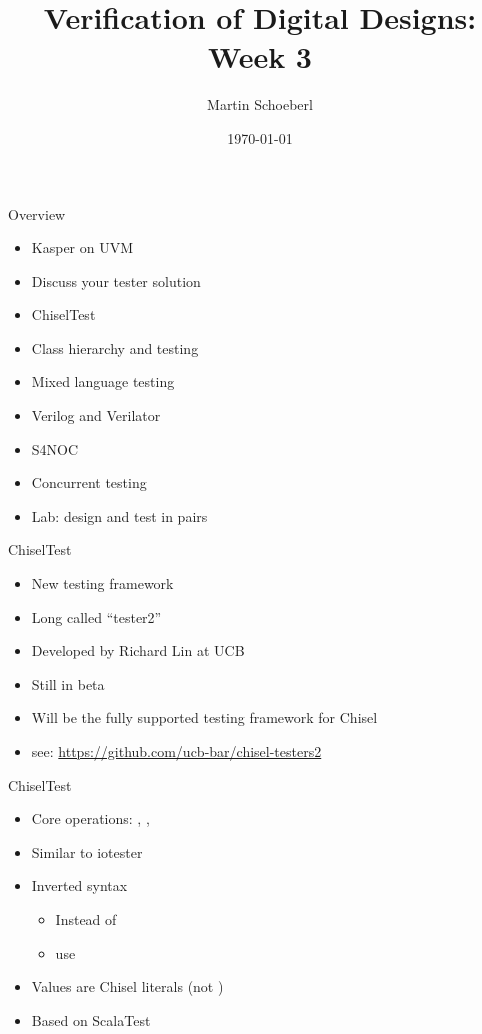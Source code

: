 

\newif\ifbook


\title{Verification of Digital Designs: Week 3}
\author{Martin Schoeberl}
\date{\today}



\begin{frame}
\titlepage
\end{frame}

\begin{frame}[fragile]{Overview}
\begin{itemize}
\item Kasper on UVM
\item Discuss your tester solution
\item ChiselTest
\item Class hierarchy and testing
\item Mixed language testing
\item Verilog and Verilator
\item S4NOC
\item Concurrent testing
\item Lab: design and test in pairs
\end{itemize}
\end{frame}

\begin{frame}[fragile]{ChiselTest}
\begin{itemize}
\item New testing framework
\item Long called ``tester2''
\item Developed by Richard Lin at UCB
\item Still in beta
\item Will be the fully supported testing framework for Chisel
\item see: \url{https://github.com/ucb-bar/chisel-testers2}
\end{itemize}
\end{frame}

\begin{frame}[fragile]{ChiselTest}
\begin{itemize}
\item Core operations: , , 
\item Similar to iotester
\item Inverted syntax
\begin{itemize}
\item Instead of 
\item use 
\end{itemize}
\item Values are Chisel literals (not )
\item Based on ScalaTest
\end{itemize}
\end{frame}



